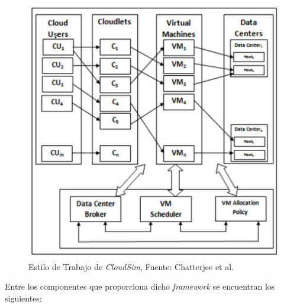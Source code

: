 \setcounter{figure}{2}
\renewcommand\thefigure{\arabic{figure}}
\begin{figure}[h!]
	\centering
	\includegraphics[scale=0.5]{media/imagenuno}
	\caption{Estilo de Trabajo de \textit{CloudSim}, Fuente: Chatterjee et al.}
	\label{fig:TrabajoCloudsim}
	
\end{figure}


Entre los componentes que proporciona dicho \textit{framework} se encuentran los siguientes:

